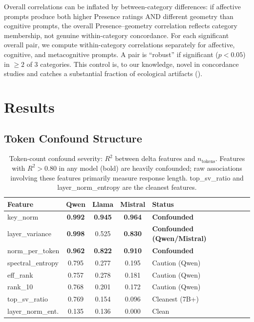 \documentclass[11pt,a4paper]{article}
\begin{document}
Overall correlations can be inflated by between-category differences: if affective prompts produce both higher Presence ratings AND different geometry than cognitive prompts, the overall Presence--geometry correlation reflects category membership, not genuine within-category concordance. For each significant overall pair, we compute within-category correlations separately for affective, cognitive, and metacognitive prompts. A pair is ``robust'' if significant ($p < 0.05$) in $\geq 2$ of 3 categories. This control is, to our knowledge, novel in concordance studies and catches a substantial fraction of ecological artifacts ().

\section{Results}

\subsection{Token Confound Structure}
\label{sec:confound}

\begin{table}[H]
\centering
\caption{Token-count confound severity: $R^2$ between delta features and $n_{\text{tokens}}$. Features with $R^2 > 0.80$ in any model (bold) are heavily confounded; raw associations involving these features primarily measure response length. top\_sv\_ratio and layer\_norm\_entropy are the cleanest features.}
\label{tab:confound}
\begin{tabular}{lcccp{3.5cm}}
\toprule
\textbf{Feature} & \textbf{Qwen} & \textbf{Llama} & \textbf{Mistral} & \textbf{Status} \\
\midrule
key\_norm           & \textbf{0.992} & \textbf{0.945} & \textbf{0.964} & \textbf{Confounded} \\
layer\_variance     & \textbf{0.998} & 0.525          & \textbf{0.830} & \textbf{Confounded (Qwen/Mistral)} \\
norm\_per\_token    & \textbf{0.962} & \textbf{0.822} & \textbf{0.910} & \textbf{Confounded} \\
spectral\_entropy   & 0.795          & 0.277          & 0.195          & Caution (Qwen) \\
eff\_rank           & 0.757          & 0.278          & 0.181          & Caution (Qwen) \\
rank\_10            & 0.768          & 0.201          & 0.172          & Caution (Qwen) \\
top\_sv\_ratio      & 0.769          & 0.154          & 0.096          & Cleanest (7B+) \\
layer\_norm\_ent.   & 0.135          & 0.136          & 0.000          & Clean \\
\bottomrule
\end{tabular}
\end{table}
\end{document}
